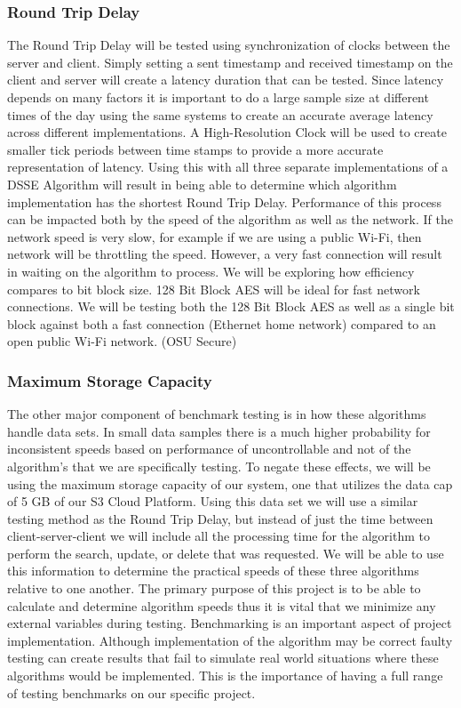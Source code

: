 \documentclass[onecolumn, draftclsnofoot,10pt, compsoc]{IEEEtran}
\begin{document}
\subsubsection {Round Trip Delay}
The Round Trip Delay will be tested using synchronization of clocks between the server and client. Simply setting a sent timestamp and received timestamp on the client and server will create a latency duration that can be tested. Since latency depends on many factors it is important to do a large sample size at different times of the day using the same systems to create an accurate average latency across different implementations. A High-Resolution Clock will be used to create smaller tick periods between time stamps to provide a more accurate representation of latency. Using this with all three separate implementations of a DSSE Algorithm will result in being able to determine which algorithm implementation has the shortest Round Trip Delay.
Performance of this process can be impacted both by the speed of the algorithm as well as the network. If the network speed is very slow, for example if we are using a public Wi-Fi, then network will be throttling the speed. However, a very fast connection will result in waiting on the algorithm to process. We will be exploring how efficiency compares to bit block size. 128 Bit Block AES will be ideal for fast network connections. We will be testing both the 128 Bit Block AES as well as a single bit block against both a fast connection (Ethernet home network) compared to an open public Wi-Fi network. (OSU Secure)


\subsubsection {Maximum Storage Capacity}
The other major component of benchmark testing is in how these algorithms handle data sets. In small data samples there is a much higher probability for inconsistent speeds based on performance of uncontrollable and not of the algorithm’s that we are specifically testing. To negate these effects, we will be using the maximum storage capacity of our system, one that utilizes the data cap of 5 GB of our S3 Cloud Platform. Using this data set we will use a similar testing method as the Round Trip Delay, but instead of just the time between client-server-client we will include all the processing time for the algorithm to perform the search, update, or delete that was requested. We will be able to use this information to determine the practical speeds of these three algorithms relative to one another. The primary purpose of this project is to be able to calculate and determine algorithm speeds thus it is vital that we minimize any external variables during testing.
Benchmarking is an important aspect of project implementation.  Although implementation of the algorithm may be correct faulty testing can create results that fail to simulate real world situations where these algorithms would be implemented. This is the importance of having a full range of testing benchmarks on our specific project.
\end{document}
